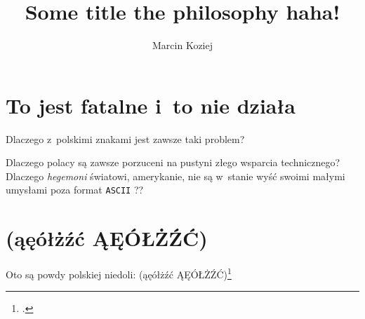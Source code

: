 \documentclass[11pt,a4paper,english]{kojart}
\title{Some title the philosophy haha!}
\author{Marcin Koziej}
\begin{document}
\maketitle


\tableofcontents

\section{To jest fatalne i~to nie działa}

Dlaczego z~polskimi znakami jest zawsze taki problem?

Dlaczego polacy są zawsze porzuceni na pustyni złego wsparcia
technicznego? Dlaczego \emph{hegemoni} światowi, amerykanie, nie są
w~stanie wyść swoimi małymi umysłami poza format \texttt{ASCII} ??

\section{(ąęółżźć ĄĘÓŁŻŹĆ)}

Oto są powdy polskiej niedoli: 
(ąęółżźć ĄĘÓŁŻŹĆ)\footcite[s. 12]{castells_power_2003}


\end{document}

